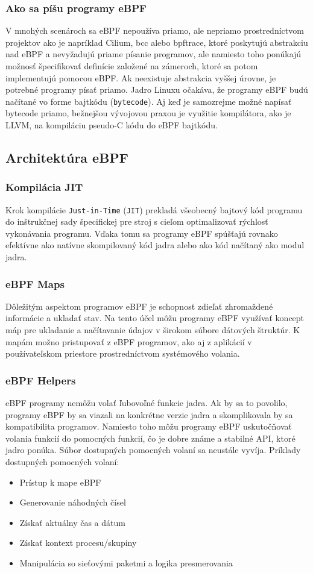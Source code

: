 \subsubsection{Ako sa píšu programy eBPF}
V mnohých scenároch sa eBPF nepoužíva priamo, ale nepriamo prostredníctvom projektov ako je napríklad Cilium, bcc alebo bpftrace, ktoré poskytujú abstrakciu nad eBPF a nevyžadujú priame písanie programov, ale namiesto toho ponúkajú možnosť špecifikovať definície založené na zámeroch, ktoré sa potom implementujú pomocou eBPF.
Ak neexistuje abstrakcia vyššej úrovne, je potrebné programy písať priamo. Jadro Linuxu očakáva, že programy eBPF budú načítané vo forme bajtkódu (\texttt{bytecode}). Aj keď je samozrejme možné napísať bytecode priamo, bežnejšou vývojovou praxou je využitie kompilátora, ako je LLVM, na kompiláciu pseudo-C kódu do eBPF bajtkódu.

\subsection{Architektúra eBPF}
\subsubsection{Kompilácia JIT}
Krok kompilácie \texttt{Just-in-Time} (\texttt{JIT}) prekladá všeobecný bajtový kód programu do inštrukčnej sady špecifickej pre stroj s cieľom optimalizovať rýchlosť vykonávania programu. Vďaka tomu sa programy eBPF spúšťajú rovnako efektívne ako natívne skompilovaný kód jadra alebo ako kód načítaný ako modul jadra.

\subsubsection{eBPF Maps}
Dôležitým aspektom programov eBPF je schopnosť zdieľať zhromaždené informácie a ukladať stav. Na tento účel môžu programy eBPF využívať koncept máp pre ukladanie a načítavanie údajov v širokom súbore dátových štruktúr. K mapám možno pristupovať z eBPF programov, ako aj z aplikácií v používateľskom priestore prostredníctvom systémového volania.

\subsubsection{eBPF Helpers}
eBPF programy nemôžu volať ľubovoľné funkcie jadra. Ak by sa to povolilo, programy eBPF by sa viazali na konkrétne verzie jadra a skomplikovala by sa kompatibilita programov. Namiesto toho môžu programy eBPF uskutočňovať volania funkcií do pomocných funkcií, čo je dobre známe a stabilné API, ktoré jadro ponúka.
Súbor dostupných pomocných volaní sa neustále vyvíja. Príklady dostupných pomocných volaní:
\begin{itemize}
\item Prístup k mape eBPF
\item Generovanie náhodných čísel
\item Získať aktuálny čas a dátum
\item Získať kontext procesu/skupiny
\item Manipulácia so sieťovými paketmi a logika presmerovania
\end{itemize}

